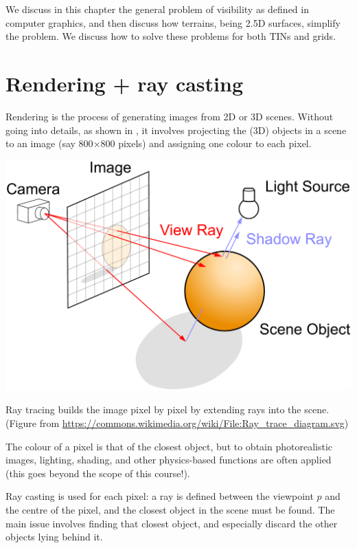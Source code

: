 %

We discuss in this chapter the general problem of visibility as defined in computer graphics, and then discuss how terrains, being 2.5D surfaces, simplify the problem.
We discuss how to solve these problems for both TINs and grids.


%
\section{Rendering + ray casting}

Rendering is the process of generating images from 2D or 3D scenes.
Without going into details, as shown in , it involves projecting the (3D) objects in a scene to an image (say 800$\times$800 pixels) and assigning one colour to each pixel.
\begin{marginfigure}
  \centering
  \includegraphics[width=\linewidth]{figs/Ray_trace_diagram.pdf}
  \caption{Ray tracing builds the image pixel by pixel by extending rays into the scene. (Figure from \url{https://commons.wikimedia.org/wiki/File:Ray_trace_diagram.svg})}%
\end{marginfigure}
The colour of a pixel is that of the closest object, but to obtain photorealistic images, lighting, shading, and other physics-based functions are often applied (this goes beyond the scope of this course!).

Ray casting is used for each pixel: a ray is defined between the viewpoint $p$ and the centre of the pixel, and the closest object in the scene must be found.
The main issue involves finding that closest object, and especially discard the other objects lying behind it.

